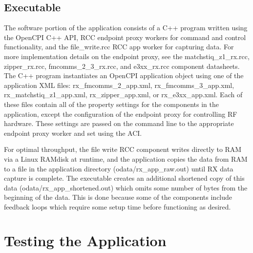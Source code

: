 \subsection{Executable}
\noindent The software portion of the application consists of a C++ program written using the OpenCPI C++ API, RCC endpoint proxy workers for command and control functionality, and the file\_write.rcc RCC app worker for capturing data. For more implementation details on the endpoint proxy, see the matchstiq\_z1\_rx.rcc,  zipper\_rx.rcc, fmcomms\_2\_3\_rx.rcc, and e3xx\_rx.rcc component datasheets. The C++ program instantiates an OpenCPI application object using one of the application XML files: rx\_fmcomms\_2\_app.xml, rx\_fmcomms\_3\_app.xml, rx\_matchstiq\_z1\_app.xml, rx\_zipper\_app.xml, or rx\_e3xx\_app.xml. Each of these files contain all of the property settings for the components in the application, except the configuration of the endpoint proxy for controlling RF hardware. These settings are passed on the command line to the appropriate endpoint proxy worker and set using the ACI.\par\bigskip
\noindent For optimal throughput, the file write RCC component writes directly to RAM via a Linux RAMdisk at runtime, and the application copies the data from RAM to a file in the application directory (odata/rx\_app\_raw.out) until RX data capture is complete. The executable creates an additional shortened copy of this data (odata/rx\_app\_shortened.out) which omits some number of bytes from the beginning of the data. This is done because some of the components include feedback loops which require some setup time before functioning as desired.
\section{Testing the Application}
